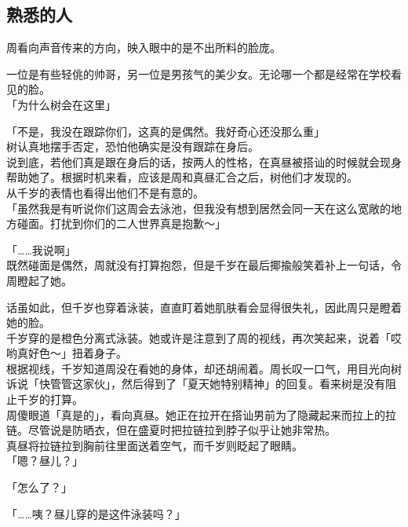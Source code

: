 \subsection{熟悉的人}

周看向声音传来的方向，映入眼中的是不出所料的脸庞。

一位是有些轻佻的帅哥，另一位是男孩气的美少女。无论哪一个都是经常在学校看见的脸。\\

「为什么树会在这里」

「不是，我没在跟踪你们，这真的是偶然。我好奇心还没那么重」\\

树认真地摆手否定，恐怕他确实是没有跟踪在身后。\\

说到底，若他们真是跟在身后的话，按两人的性格，在真昼被搭讪的时候就会现身帮助她了。根据时机来看，应该是周和真昼汇合之后，树他们才发现的。\\

从千岁的表情也看得出他们不是有意的。\\

「虽然我是有听说你们这周会去泳池，但我没有想到居然会同一天在这么宽敞的地方碰面。打扰到你们的二人世界真是抱歉～」

「……我说啊」\\

既然碰面是偶然，周就没有打算抱怨，但是千岁在最后揶揄般笑着补上一句话，令周瞪起了她。

话虽如此，但千岁也穿着泳装，直直盯着她肌肤看会显得很失礼，因此周只是瞪着她的脸。\\

千岁穿的是橙色分离式泳装。她或许是注意到了周的视线，再次笑起来，说着「哎哟真好色～」扭着身子。\\

根据视线，千岁知道周没在看她的身体，却还胡闹着。周长叹一口气，用目光向树诉说「快管管这家伙」，然后得到了「夏天她特别精神」的回复。看来树是没有阻止千岁的打算。\\

周傻眼道「真是的」，看向真昼。她正在拉开在搭讪男前为了隐藏起来而拉上的拉链。尽管说是防晒衣，但在盛夏时把拉链拉到脖子似乎让她非常热。\\

真昼将拉链拉到胸前往里面送着空气，而千岁则眨起了眼睛。\\

「嗯？昼儿？」

「怎么了？」

「……咦？昼儿穿的是这件泳装吗？」

